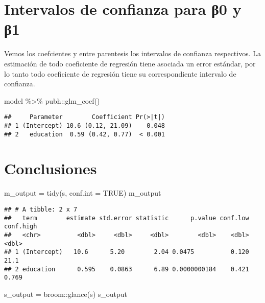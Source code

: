 \documentclass[
]{article}
\newenvironment{Shaded}{\begin{snugshade}}{\end{snugshade}}
\newcommand{\AttributeTok}[1]{\textcolor[rgb]{0.77,0.63,0.00}{#1}}
\newcommand{\ConstantTok}[1]{\textcolor[rgb]{0.00,0.00,0.00}{#1}}
\newcommand{\FunctionTok}[1]{\textcolor[rgb]{0.00,0.00,0.00}{#1}}
\newcommand{\NormalTok}[1]{#1}
\newcommand{\OtherTok}[1]{\textcolor[rgb]{0.56,0.35,0.01}{#1}}
\newcommand{\SpecialCharTok}[1]{\textcolor[rgb]{0.00,0.00,0.00}{#1}}
\begin{document}
\hypertarget{intervalos-de-confianza-para-ux3b20-y-ux3b21}{%
\section{Intervalos de confianza para β0 y
β1}\label{intervalos-de-confianza-para-ux3b20-y-ux3b21}}

Vemos los coefcientes y entre parentesis los intervalos de confianza
respectivos. La estimación de todo coeficiente de regresión tiene
asociada un error estándar, por lo tanto todo coeficiente de regresión
tiene su correspondiente intervalo de confianza.

\begin{Shaded}
\begin{Highlighting}[]
\NormalTok{model }\SpecialCharTok{\%\textgreater{}\%} 
\NormalTok{  pubh}\SpecialCharTok{::}\FunctionTok{glm\_coef}\NormalTok{()}
\end{Highlighting}
\end{Shaded}

\begin{verbatim}
##     Parameter        Coefficient Pr(>|t|)
## 1 (Intercept) 10.6 (0.12, 21.09)    0.048
## 2   education  0.59 (0.42, 0.77)  < 0.001
\end{verbatim}

\hypertarget{conclusiones}{%
\section{Conclusiones}\label{conclusiones}}

\begin{Shaded}
\begin{Highlighting}[]
\NormalTok{m\_output }\OtherTok{=} \FunctionTok{tidy}\NormalTok{(s, }\AttributeTok{conf.int =} \ConstantTok{TRUE}\NormalTok{)}
\NormalTok{m\_output}
\end{Highlighting}
\end{Shaded}

\begin{verbatim}
## # A tibble: 2 x 7
##   term        estimate std.error statistic      p.value conf.low conf.high
##   <chr>          <dbl>     <dbl>     <dbl>        <dbl>    <dbl>     <dbl>
## 1 (Intercept)   10.6      5.20        2.04 0.0475          0.120    21.1  
## 2 education      0.595    0.0863      6.89 0.0000000184    0.421     0.769
\end{verbatim}

\begin{Shaded}
\begin{Highlighting}[]
\NormalTok{s\_output }\OtherTok{=}\NormalTok{ broom}\SpecialCharTok{::}\FunctionTok{glance}\NormalTok{(s) }
\NormalTok{s\_output}
\end{Highlighting}
\end{Shaded}
\end{document}
